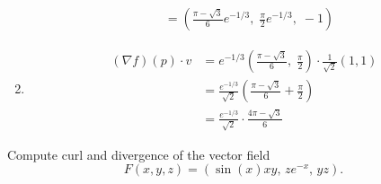 \documentclass[11pt]{article}
\begin{document}
\begin{solution}
\begin{enumerate}
$$\begin{aligned}
				                         & = \left( \frac{\pi - \sqrt{3}}{6} e^{-1/3}, \; \frac{\pi}{2} e^{-1/3},\; -1 \right)
			      \end{aligned}
		      $$
		\item
		      $$
			      \begin{aligned}
				      (\nabla f)(p) \cdot v & = e^{-1/3} \left( \frac{\pi - \sqrt{3}}{6}, \; \frac{\pi}{2} \right) \cdot \frac{1}{\sqrt{2}} (1,1) \\
				                            & = \frac{e^{-1/3}}{\sqrt{2}} \left( \frac{\pi - \sqrt{3}}{6} + \frac{\pi}{2} \right)                 \\
				                            & = \frac{e^{-1/3}}{\sqrt{2}} \cdot \frac{4\pi - \sqrt{3}}{6}
			      \end{aligned}
		      $$
	\end{enumerate}
\end{solution}

\begin{exercise}
	Compute curl and divergence of the vector field
	$$
		F(x,y,z) = (\sin(x)xy, \, ze^{-x}, \, yz).
	$$
\end{exercise}
\end{document}
